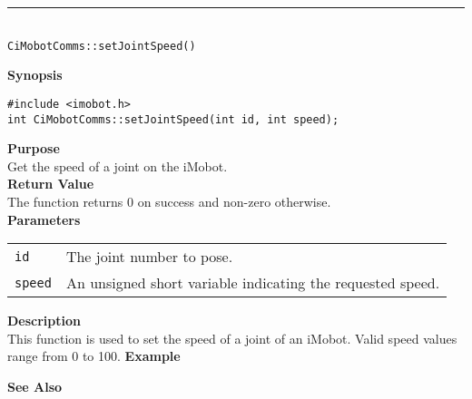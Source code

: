 \noindent
\vspace{5pt}
\rule{4.5in}{0.015in}\\
\noindent
{\LARGE \texttt{CiMobotComms::setJointSpeed()}}\\
{}

\noindent
{\bf Synopsis}\\
\begin{verbatim}
#include <imobot.h>
int CiMobotComms::setJointSpeed(int id, int speed);
\end{verbatim}

\noindent
{\bf Purpose}\\
Get the speed of a joint on the iMobot.\\

\noindent
{\bf Return Value}\\
The function returns 0 on success and non-zero otherwise.\\

\noindent
{\bf Parameters}
\vspace{-0.1in}
\begin{description}
\item               
\begin{tabular}{p{10 mm}p{145 mm}}
\texttt{id} & The joint number to pose. \\
\texttt{speed} & An unsigned short variable indicating the requested speed.
\end{tabular}
\end{description}

\noindent
{\bf Description}\\
This function is used to set the speed of a joint of an iMobot. Valid speed
values range from 0 to 100.
\noindent
{\bf Example}\\
\noindent

\noindent
{\bf See Also}\\

